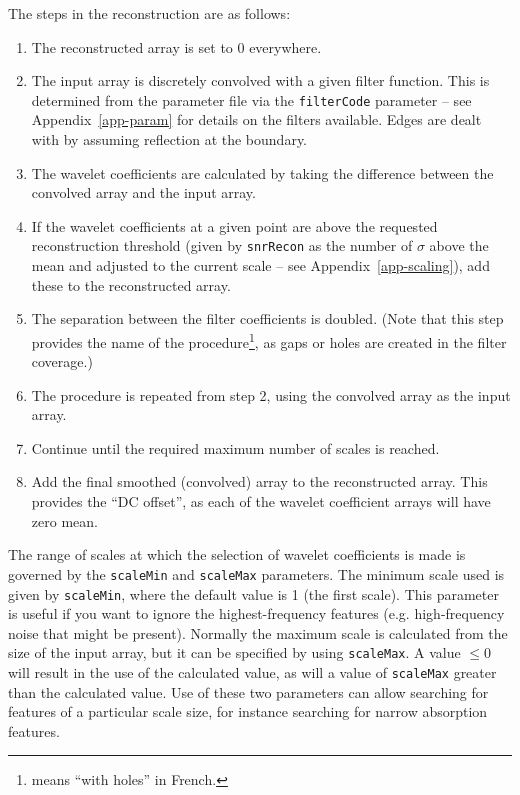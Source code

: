 The steps in the \atrous reconstruction are as follows:
\begin{enumerate}
\item The reconstructed array is set to 0 everywhere.
\item The input array is discretely convolved with a given filter
  function. This is determined from the parameter file via the
  \texttt{filterCode} parameter -- see Appendix~\ref{app-param} for
  details on the filters available. Edges are dealt with by assuming
  reflection at the boundary.
\item The wavelet coefficients are calculated by taking the difference
  between the convolved array and the input array.
\item If the wavelet coefficients at a given point are above the
  requested reconstruction threshold (given by \texttt{snrRecon} as
  the number of $\sigma$ above the mean and adjusted to the current
  scale -- see Appendix~\ref{app-scaling}), add these to the
  reconstructed array.
\item The separation between the filter coefficients is doubled. (Note
  that this step provides the name of the procedure\footnote{\atrous
  means ``with holes'' in French.}, as gaps or holes are created in
  the filter coverage.)
\item The procedure is repeated from step 2, using the convolved array
  as the input array.
\item Continue until the required maximum number of scales is reached.
\item Add the final smoothed (\ie convolved) array to the
  reconstructed array. This provides the ``DC offset'', as each of the
  wavelet coefficient arrays will have zero mean.
\end{enumerate}

The range of scales at which the selection of wavelet coefficients is
made is governed by the \texttt{scaleMin} and \texttt{scaleMax}
parameters. The minimum scale used is given by \texttt{scaleMin},
where the default value is 1 (the first scale). This parameter is
useful if you want to ignore the highest-frequency features
(e.g. high-frequency noise that might be present). Normally the
maximum scale is calculated from the size of the input array, but it
can be specified by using \texttt{scaleMax}. A value $\le0$ will
result in the use of the calculated value, as will a value of
\texttt{scaleMax} greater than the calculated value. Use of these two
parameters can allow searching for features of a particular scale
size, for instance searching for narrow absorption features.

